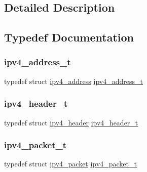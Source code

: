 \subsection{Detailed Description}


\subsection{Typedef Documentation}
\mbox{\label{group__ipv4_gad9df0882950e70d0587a4b423beb261a}} 
\subsubsection{\texorpdfstring{ipv4\_address\_t}{ipv4\_address\_t}}
{\footnotesize\ttfamily typedef struct \mbox{\hyperlink{structipv4__address}{ipv4\+\_\+address}}  \mbox{\hyperlink{group__ipv4_gad9df0882950e70d0587a4b423beb261a}{ipv4\+\_\+address\+\_\+t}}}

\mbox{\label{group__ipv4_gaf4f2c6743b9fb1ea3c69734612ce41de}} 
\subsubsection{\texorpdfstring{ipv4\_header\_t}{ipv4\_header\_t}}
{\footnotesize\ttfamily typedef struct \mbox{\hyperlink{structipv4__header}{ipv4\+\_\+header}}  \mbox{\hyperlink{group__ipv4_gaf4f2c6743b9fb1ea3c69734612ce41de}{ipv4\+\_\+header\+\_\+t}}}

\mbox{\label{group__ipv4_ga68ea36d252d9332fd5e37d9aaedd06af}} 
\subsubsection{\texorpdfstring{ipv4\_packet\_t}{ipv4\_packet\_t}}
{\footnotesize\ttfamily typedef struct \mbox{\hyperlink{structipv4__packet}{ipv4\+\_\+packet}}  \mbox{\hyperlink{group__ipv4_ga68ea36d252d9332fd5e37d9aaedd06af}{ipv4\+\_\+packet\+\_\+t}}}

\mbox{\label{group__ipv4_gaf689af7304e282d1606e70bf56cbc3d4}} 
